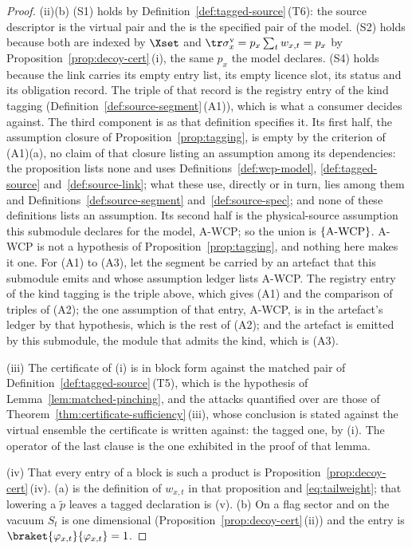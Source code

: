 \begin{proof}
(ii)(b) (S1) holds by Definition~\ref{def:tagged-source}\,(T6): the source
descriptor is the virtual pair and the  is the specified pair
of the model. (S2) holds because both are indexed by $\Xset$ and
$\tr\sigma^{\mathrm v}_x=p_x\sum_tw_{x,t}=p_x$ by
Proposition~\ref{prop:decoy-cert}\,(i), the same $p_x$ the model declares. (S4)
holds because the link carries its empty entry list, its empty licence slot,
its status and its obligation record. The triple of that record is the registry
entry of the kind \textsf{tagging} (Definition~\ref{def:source-segment}\,(A1)),
which is what a consumer decides against. The third component is as that
definition specifies it. Its first half, the assumption closure of
Proposition~\ref{prop:tagging}, is empty by the criterion of (A1)(a), no claim
of that closure listing an assumption among its dependencies: the proposition
lists none and uses Definitions~\ref{def:wcp-model}, \ref{def:tagged-source}
and~\ref{def:source-link}; what these use, directly or in turn, lies among
them and Definitions~\ref{def:source-segment} and~\ref{def:source-spec}; and
none of these definitions lists an assumption. Its second half is the
physical-source assumption this submodule declares for the model, A-WCP; so
the union is $\{\mathrm{A\textnormal{-}WCP}\}$. A-WCP is not a
hypothesis of Proposition~\ref{prop:tagging}, and nothing here makes it one.
For (A1) to (A3), let the segment be carried by an artefact that this
submodule emits and whose assumption ledger lists A-WCP. The registry entry of
the kind \textsf{tagging} is the triple above, which gives (A1) and the
comparison of triples of (A2); the one assumption of that entry, A-WCP, is in
the artefact's ledger by that hypothesis, which is the rest of (A2); and the
artefact is emitted by this submodule, the module that admits the kind, which
is (A3).

(iii) The certificate of (i) is in block form against the matched pair of
Definition~\ref{def:tagged-source}\,(T5), which is the hypothesis of
Lemma~\ref{lem:matched-pinching}, and the attacks quantified over are those of
Theorem~\ref{thm:certificate-sufficiency}\,(iii), whose conclusion is stated against the virtual
ensemble the certificate is written against: the tagged one, by (i). The
operator of the last clause is the one exhibited in the proof of that lemma.

(iv) That every entry of a block is such a product is
Proposition~\ref{prop:decoy-cert}\,(iv). (a) is the definition of $w_{x,t}$ in
that proposition and \eqref{eq:tailweight}; that lowering a $\tilde p$ leaves a
tagged declaration is (v). (b) On a flag sector and on the
vacuum $S_t$ is one dimensional (Proposition~\ref{prop:decoy-cert}\,(ii)) and
the entry is $\braket{\varphi_{x,t}}{\varphi_{x,t}}=1$.


\end{proof}
